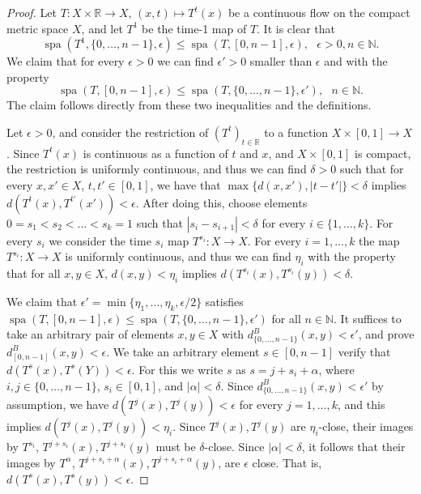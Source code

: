 \documentclass[a4paper,oneside]{amsart}
\renewcommand{\(}{\begin{dmath*}}
\renewcommand{\)}{\end{dmath*}}
\theoremstyle{definition}
\newcommand{\N}{\mathbb{N}}
\newcommand{\R}{\mathbb{R}}
\newcommand{\spa}{\operatorname{spa}}
\begin{document}
\begin{proof}
Let $T\colon X\times \R\to X$, $(x,t)\mapsto T^{t}(x)$ be a continuous flow on the compact metric space $X$, and let  $T^1$ be the time-1 map of $T$. It is clear that
\[\spa(T^1,\{0,\dots,n-1\},\epsilon)\leq \spa(T,[0,n-1],\epsilon),\ \ \  \epsilon>0, n\in\N.\]
We claim that for every $\epsilon>0$ we can find $\epsilon'>0$ smaller than $\epsilon$ and with the property
\[\spa(T,[0,n-1],\epsilon)\leq \spa(T,\{0,\dots,n-1\}, \epsilon'),\ \ \  n\in\N.\]
The claim follows directly from these two inequalities and the definitions.

Let $\epsilon>0$, and consider the restriction of $(T^t)_{t\in\R}$ to a function $X\times [0,1]\to X$. Since $T^t(x)$ is continuous as a function of $t$ and $x$, and $X\times [0,1]$ is compact, the restriction is uniformly continuous, and thus we can find $\delta>0$ such that for every $x,x'\in X$, $t,t'\in [0,1]$, we have that $\max\{d(x,x'),|t-t'|\}<\delta$ implies $d(T^t(x),T^{t'}(x'))<\epsilon$. After doing this, choose elements $0=s_1<s_2<\dots<s_k=1$ such that $|s_i-s_{i+1}|<\delta$ for every $i\in\{1,\dots,k\}$. For every $s_i$ we consider the time $s_i$ map $T^{s_i}\colon X\to X$. For every $i=1,\dots,k$ the map $T^{s_i}\colon X\to X$ is uniformly continuous, and thus we can find  $\eta_i$ with the property that for all $x,y\in X$, $d(x,y)<\eta_i$ implies $d(T^{s_i}(x),T^{s_i}(y))<\delta$. 

We claim that  $\epsilon'=\min\{\eta_1,\dots,\eta_k,\epsilon/2\}$ satisfies $\spa(T,[0,n-1],\epsilon)\leq \spa(T,\{0,\dots,n-1\}, \epsilon')$ for all $n\in\N$. It suffices to take an arbitrary pair of elements $x,y\in X$ with $d^B_{\{0,\dots,n-1\}}(x,y)<\epsilon'$, and prove $d^B_{[0,n-1]}(x,y)<\epsilon$. We take an arbitrary element $s\in [0,n-1]$ verify that  $d(T^{s}(x),T^{s}(Y))<\epsilon$. For this we write $s$ as $s=j+s_i+\alpha$, where $i,j\in\{0,\dots,n-1\}$, $s_i\in [0,1]$, and $|\alpha|<\delta$. %
     Since $d^B_{\{0,\dots,n-1\}}(x,y)<\epsilon'$ by assumption, we have  $d(T^j(x),T^j(y))<\epsilon$ for every $j=1,\dots,k$, and this implies  $d(T^j(x),T^j(y))<\eta_i$. Since  $T^j(x),T^j(y)$ are $\eta_i$-close, their images by $T^{s_i}$, $T^{j+s_i}(x),T^{j+s_i}(y)$ must be $\delta$-close. Since $|\alpha|<\delta$, it follows that their images by $T^{\alpha}$, $T^{j+s_i+\alpha}(x),T^{j+s_i+\alpha}(y)$, are $\epsilon$ close. That is, $d(T^{s}(x),T^{s}(y))<\epsilon$. 
\end{proof}



\end{document}
